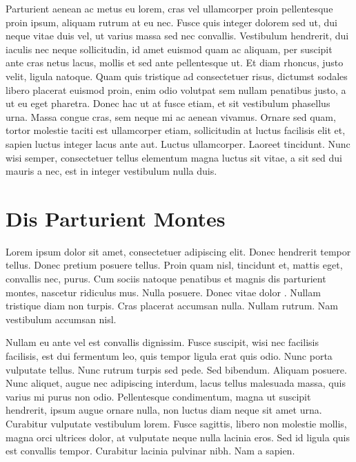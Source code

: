 Parturient aenean ac metus eu lorem, cras vel ullamcorper proin
pellentesque proin ipsum, aliquam rutrum at eu nec. Fusce quis integer
dolorem sed ut, dui neque vitae duis vel, ut varius massa sed nec
convallis. Vestibulum hendrerit, dui iaculis nec neque sollicitudin, id
amet euismod quam ac aliquam, per suscipit ante cras netus lacus, mollis
et sed ante pellentesque ut. Et diam rhoncus, justo velit, ligula
natoque. Quam quis tristique ad consectetuer risus, dictumst sodales
libero placerat euismod proin, enim odio volutpat sem nullam penatibus
justo, a ut eu eget pharetra. Donec hac ut at fusce etiam, et sit
vestibulum phasellus urna. Massa congue cras, sem neque mi ac aenean
vivamus. Ornare sed quam, tortor molestie taciti est ullamcorper etiam,
sollicitudin at luctus facilisis elit et, sapien luctus integer lacus
ante aut. Luctus ullamcorper. Laoreet tincidunt. Nunc wisi semper,
consectetuer tellus elementum magna luctus sit vitae, a sit sed dui
mauris a nec, est in integer vestibulum nulla duis.

%
%
%

\section{Dis Parturient Montes}
\label{sec:example-chapter:dis-part-montes}

%
Lorem ipsum dolor sit amet, consectetuer adipiscing elit. Donec
hendrerit tempor tellus. Donec pretium posuere tellus. Proin quam nisl,
tincidunt et, mattis eget, convallis nec, purus. Cum sociis natoque
penatibus et magnis dis parturient montes, nascetur ridiculus mus. Nulla
posuere. Donec vitae dolor \citep{lamport93:_how_write_proof}. Nullam
tristique diam non turpis. Cras placerat accumsan nulla. Nullam
rutrum. Nam vestibulum accumsan nisl.

%
Nullam eu ante vel est convallis dignissim. Fusce suscipit, wisi nec
facilisis facilisis, est dui fermentum leo, quis tempor ligula erat quis
odio. Nunc porta vulputate tellus. Nunc rutrum turpis sed pede. Sed
bibendum. Aliquam posuere. Nunc aliquet, augue nec adipiscing interdum,
lacus tellus malesuada massa, quis varius mi purus non
odio. Pellentesque condimentum, magna ut suscipit hendrerit, ipsum augue
ornare nulla, non luctus diam neque sit amet urna. Curabitur vulputate
vestibulum lorem. Fusce sagittis, libero non molestie mollis, magna orci
ultrices dolor, at vulputate neque nulla lacinia eros. Sed id ligula
quis est convallis tempor. Curabitur lacinia pulvinar nibh. Nam a
sapien.

